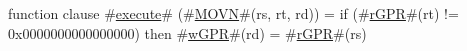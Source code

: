 function clause #\hyperref[zexecute]{execute}# (#\hyperref[zMOVN]{MOVN}#(rs, rt, rd)) =
  {
    if (#\hyperref[zrGPR]{rGPR}#(rt) != 0x0000000000000000) then
      #\hyperref[zwGPR]{wGPR}#(rd) = #\hyperref[zrGPR]{rGPR}#(rs)
  }
